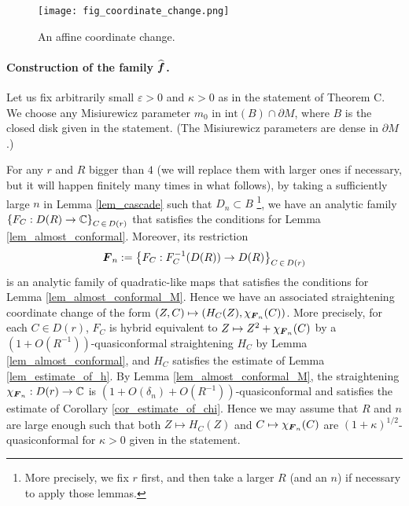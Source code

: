 \begin{figure}[htbp]
\begin{center}
\texttt{[image: fig\_coordinate\_change.png]}
\end{center}
\caption{\small 
An affine coordinate change.}
\label{fig_affine_coordinate_change}
\end{figure}

\paragraph{\bf Construction of the family $\widehat{\boldsymbol{f}}$.}
Let us fix arbitrarily small $\varepsilon>0$ 
and $\kappa>0$ as in the statement of Theorem C.
We choose any Misiurewicz parameter 
$m_0$ in $\mathrm{int}(B) \cap \partial M$,
where $B$ is the closed disk given in the statement.
(The Misiurewicz parameters are dense in $\partial M$.)



For any $r$ and $R$ bigger than $4$
(we will replace them with larger ones if necessary,
but it will happen finitely many times in what follows),
by taking a sufficiently large $n$ in Lemma \ref{lem_cascade}
such that $D_n \subset B$
\footnote{More precisely, we fix $r$ first, 
and then take a larger $R$ (and an $n$) if necessary to
apply those lemmas.},
we have an analytic family 
${\left\{ F_C: D(R) \to \mathbb C \right\}}_{C \,\in \,D(r)}$
that satisfies the conditions for 
Lemma \ref{lem_almost_conformal}.
Moreover, its restriction
$$
{\boldsymbol{F}}_n:=
{\left\{ F_C: F_C^{-1}(D(R)) \to D(R) \right\}}_{C \,\in \,D(r)}
$$
is an analytic family of quadratic-like maps
that satisfies the conditions for 
Lemma \ref{lem_almost_conformal_M}.
Hence we have an associated straightening coordinate change
of the form $(Z,C) \mapsto (H_C(Z), \chi_{{\boldsymbol{F}}_n}(C))$.
More precisely, for each $C \in D(r)$, 
$F_C$ is hybrid equivalent to 
$Z \mapsto Z^2+\chi_{{\boldsymbol{F}}_n}(C)$
by a $(1+O(R^{-1}))$-quasiconformal straightening $H_C$
by Lemma \ref{lem_almost_conformal}, 
and $H_C$ satisfies the estimate of Lemma \ref{lem_estimate_of_h}.
By Lemma \ref{lem_almost_conformal_M}, 
the straightening $\chi_{{\boldsymbol{F}}_n}: D(r) \to \mathbb C$
is $(1+O(\delta_n)+O(R^{-1}))$-quasiconformal
and satisfies the estimate of Corollary \ref{cor_estimate_of_chi}.
Hence we may assume that $R$ and $n$ are large enough such that
both $Z \mapsto H_C(Z)$ and $C \mapsto \chi_{{\boldsymbol{F}}_n}(C)$
are $(1+\kappa)^{1/2}$-quasiconformal for 
$\kappa >0$ given in the statement.

